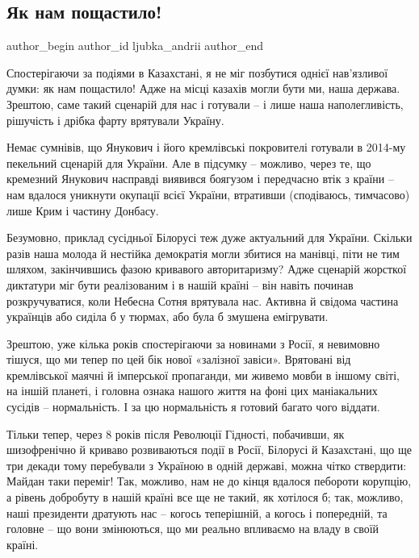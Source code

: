  
 
 
 
 
\subsection{Як нам пощастило!}
\label{sec:14_01_2022.stz.news.ua.den.1.jak_nam_poschastylo}

\ifcmt
 author_begin
   author_id ljubka_andrii
 author_end
\fi

Спостерігаючи за подіями в Казахстані, я не міг позбутися однієї нав’язливої
думки: як нам пощастило! Адже на місці казахів могли бути ми, наша держава.
Зрештою, саме такий сценарій для нас і готували – і лише наша наполегливість,
рішучість і дрібка фарту врятували Україну.

Немає сумнівів, що Янукович і його кремлівські покровителі готували в 2014-му
пекельний сценарій для України. Але в підсумку – можливо, через те, що
кремезний Янукович насправді виявився боягузом і передчасно втік з країни – нам
вдалося уникнути окупації всієї України, втративши (сподіваюсь, тимчасово) лише
Крим і частину Донбасу.

Безумовно, приклад сусідньої Білорусі теж дуже актуальний для України. Скільки
разів наша молода й нестійка демократія могли збитися на манівці, піти не тим
шляхом, закінчившись фазою кривавого авторитаризму? Адже сценарій жорсткої
диктатури міг бути реалізованим і в нашій країні – він навіть починав
розкручуватися, коли Небесна Сотня врятувала нас. Активна й свідома частина
українців або сиділа б у тюрмах, або була б змушена емігрувати.

Зрештою, уже кілька років спостерігаючи за новинами з Росії, я невимовно
тішуся, що ми тепер по цей бік нової «залізної завіси». Врятовані від
кремлівської маячні й імперської пропаганди, ми живемо мовби в іншому світі, на
іншій планеті, і головна ознака нашого життя на фоні цих маніакальних сусідів –
нормальність. І за цю нормальність я готовий багато чого віддати.

Тільки тепер, через 8 років після Революції Гідності, побачивши, як
шизофренічно й криваво розвиваються події в Росії, Білорусі й Казахстані, що ще
три декади тому перебували з Україною в одній державі, можна чітко ствердити:
Майдан таки переміг! Так, можливо, нам не до кінця вдалося пебороти корупцію, а
рівень добробуту в нашій країні все ще не такий, як хотілося б; так, можливо,
наші президенти дратують нас – когось теперішній, а когось і попередній, та
головне – що вони змінюються, що ми реально впливаємо на владу в своїй країні.

